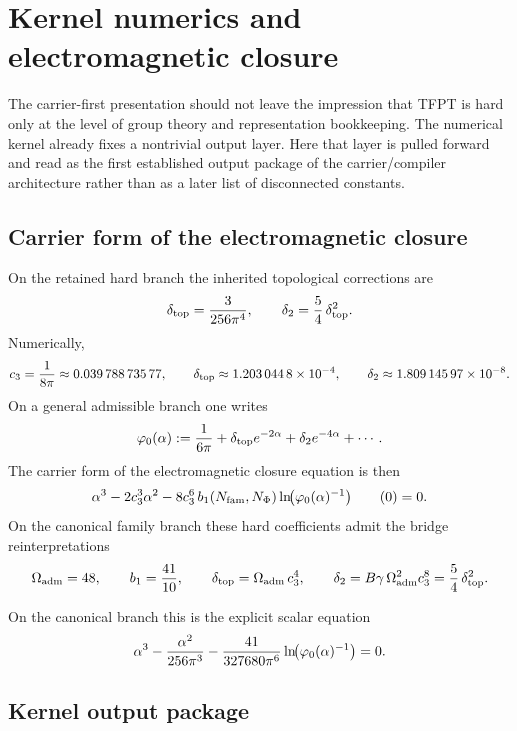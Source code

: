 \section{Kernel numerics and electromagnetic closure}

The carrier-first presentation should not leave the impression that TFPT is hard only at the level of group theory and representation bookkeeping. The numerical kernel already fixes a nontrivial output layer. Here that layer is pulled forward and read as the first established output package of the carrier/compiler architecture rather than as a later list of disconnected constants.

\subsection{Carrier form of the electromagnetic closure}

On the retained hard branch the inherited topological corrections are
\begin{equation}
\label{eq:hard-topological-kernel}
\delta_{\mathrm{top}}=\frac{3}{256\pi^4},
\qquad
\delta_2=\frac54\,\delta_{\mathrm{top}}^2.
\end{equation}
Numerically,
\[
c_3=\frac{1}{8\pi}\approx \num{0.03978873577},
\qquad
\delta_{\mathrm{top}}\approx \num{1.2030448e-4},
\qquad
\delta_2\approx \num{1.80914597e-8}.
\]
On a general admissible branch one writes
\begin{equation}
\label{eq:phi-opening}
\varphi_0(\alpha)
:=
\frac{1}{6\pi}
+ \delta_{\mathrm{top}} e^{-2\alpha}
+ \delta_2 e^{-4\alpha}
+ \cdots.
\end{equation}
The carrier form of the electromagnetic closure equation is then
\label{eq:carrier-cfe}
\[
\alpha^3
-2c_3^3\alpha^2
-8c_3^6\,b_1(N_{\mathrm{fam}},N_\Phi)
\ln\!\bigl(\varphi_0(\alpha)^{-1}\bigr)\tag{\theequation}
=0.
\]
On the canonical family branch these hard coefficients admit the bridge reinterpretations
\[
\Omega_{\mathrm{adm}}=48,
\qquad
b_1=\frac{41}{10},
\qquad
\delta_{\mathrm{top}}=\Omega_{\mathrm{adm}}\,c_3^4,
\qquad
\delta_2=B\gamma\,\Omega_{\mathrm{adm}}^2c_3^8=\frac54\,\delta_{\mathrm{top}}^2.
\]

On the canonical branch this is the explicit scalar equation
\[
\alpha^3-\frac{\alpha^2}{256\pi^3}-\frac{41}{327680\pi^6}\ln\!\bigl(\varphi_0(\alpha)^{-1}\bigr)=0.
\]

\subsection{Kernel output package}

